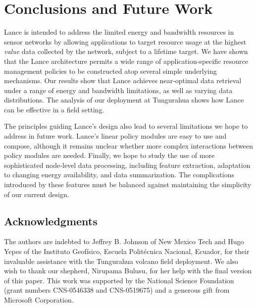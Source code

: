 \section{Conclusions and Future Work}
\label{sec-conclusions}
\label{sec-conclusion}
\label{sec-future}
\label{sec-futurework}

Lance is intended to address the limited energy and bandwidth resources in
sensor networks by allowing applications to target resource usage at the
highest {\em value} data collected by the network, subject to a lifetime
target.  We have shown that the Lance architecture permits a wide range of
application-specific resource management policies to be constructed atop
several simple underlying mechanisms. Our results show that Lance achieves
near-optimal data retrieval under a range of energy and bandwidth
limitations, as well as varying data distributions. The analysis of our
deployment at Tungurahua shows how Lance can be effective in a field
setting. 

The principles guiding Lance's design also lead to several limitations we
hope to address in future work.  Lance's linear policy modules are easy to
use and compose, although it remains unclear whether more complex
interactions between policy modules are needed. Finally, we hope to study the
use of more sophisticated node-level data processing, including feature
extraction, adaptation to changing energy availability, and data
summarization.  The complications introduced by these features must be
balanced against maintaining the simplicity of our current design.

\subsection*{Acknowledgments}

The authors are indebted to Jeffrey B. Johnson of New Mexico Tech and 
Hugo Yepes of the Instituto Geof\'{i}sico, Escuela Polit\'{e}cnica
Nacional, Ecuador, for their invaluable assistance with the Tungurahua 
volcano field deployment. We also wish to thank our shepherd, Nirupama
Bulusu, for her help with the final version of this paper. This work was 
supported by the National Science Foundation (grant numbers CNS-0546338 
and CNS-0519675) and a generous gift from Microsoft Corporation.

